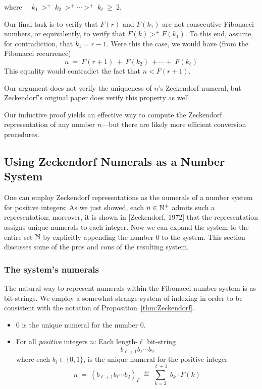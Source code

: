 \smallskip

\noindent
where \ \ $k_1 \ >^+ \ k_2 \ >^+ \cdots >^+ \ k_\ell \ \geq \ 2$.

\smallskip 

Our final task is to verify that $F(r)$ and $F(k_1)$ are not consecutive Fibonacci numbers, or equivalently, to verify that $F(k) >^+ F(k_1)$.  To this end, assume, for contradiction, that $k_1=r-1$.  Were this the case, we would have (from the Fibonacci recurrence)
\[ n \ = \ F(r+1) \ + \ F(k_2) \ + \cdots + \ F(k_\ell) \]
This equality would contradict the fact that $n < F(r+1)$.

\smallskip

Our argument does not verify the uniqueness of $n$'s Zeckendorf numeral, but Zeckendorf's original paper does verify this property as well.

\medskip

Our inductive proof yields an effective way to compute the Zeckendorf representation of any number $n$---but there are likely more efficient conversion procedures.

\subsection{Using Zeckendorf Numerals as a Number System}
\label{sec:Zeck-rep-number-system}

One can employ Zeckendorf representations as the numerals of a number system for positive integers:  As we just showed, each $n \in \mathbb{N}^+$ admits such a representation; moreover, it is shown in [Zeckendorf, 1972] that the representation assigns unique numerals to each integer.  Now we can expand the system to the entire set $\mathbb{N}$ by explicitly appending the number $0$ to the system.  This section discusses some of the pros and cons of the resulting system.


\subsubsection{The system's numerals}

The natural way to represent numerals within the Fibonacci number system is as bit-strings.  We employ a somewhat strange system of indexing in order to be consistent with the notation of Proposition~\ref{thm:Zeckendorf}.
\begin{itemize}
\item
$0$ is the unique numeral for the number $0$.
\item
For all {\em positive} integers $n$: Each length-$\ell$ bit-string
\[ b_{\ell+1} b_{\ell} \cdots b_2 \]
where each $b_i \in \{0,1\}$, is the unique numeral for the positive integer
\[ n \ = \ (b_{\ell+1} b_\ell \cdots b_2)_F \ \eqdef \  \sum_{k=2}^{\ell+1} \ b_k \cdot F(k) \]
\end{itemize}


